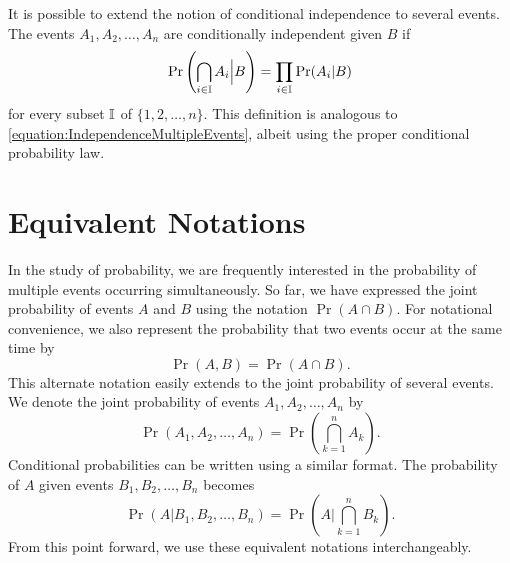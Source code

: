 It is possible to extend the notion of conditional independence to several events.
The events $A_1, A_2, \ldots, A_n$ are conditionally independent given $B$ if
\begin{equation*}
\Pr \left( \bigcap_{i \in \mathbb{I}} A_i \Big| B \right)
= \prod_{i \in \mathbb{I}} \Pr (A_i | B)
\end{equation*}
for every subset $\mathbb{I}$ of $\{1, 2, \ldots, n\}$.
This definition is analogous to \eqref{equation:IndependenceMultipleEvents}, albeit using the proper conditional probability law.


\section{Equivalent Notations}

In the study of probability, we are frequently interested in the probability of multiple events occurring simultaneously.
So far, we have expressed the joint probability of events $A$ and $B$ using the notation $\Pr (A \cap B)$.
For notational convenience, we also represent the probability that two events occur at the same time by
\begin{equation*}
\Pr (A, B) = \Pr (A \cap B) .
\end{equation*}
This alternate notation easily extends to the joint probability of several events.
We denote the joint probability of events $A_1, A_2, \ldots, A_n$ by
\begin{equation*}
\Pr (A_1, A_2, \ldots, A_n) =
\Pr \left( \bigcap_{k=1}^n A_k \right) .
\end{equation*}
Conditional probabilities can be written using a similar format.
The probability of $A$ given events $B_1, B_2, \ldots, B_n$ becomes
\begin{equation*}
\Pr (A | B_1, B_2, \ldots, B_n) =
\Pr \left( A \bigg| \bigcap_{k=1}^n B_k \right) .
\end{equation*}
From this point forward, we use these equivalent notations interchangeably.
